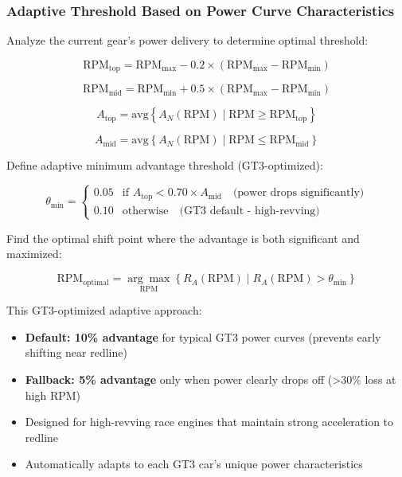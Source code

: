 \documentclass[12pt]{article}
\begin{document}
\subsubsection{Adaptive Threshold Based on Power Curve Characteristics}

Analyze the current gear's power delivery to determine optimal threshold:

\begin{equation}
\text{RPM}_{\text{top}} = \text{RPM}_{\max} - 0.2 \times (\text{RPM}_{\max} - \text{RPM}_{\min})
\end{equation}

\begin{equation}
\text{RPM}_{\text{mid}} = \text{RPM}_{\min} + 0.5 \times (\text{RPM}_{\max} - \text{RPM}_{\min})
\end{equation}

\begin{equation}
A_{\text{top}} = \text{avg}\left\{A_N(\text{RPM}) \mid \text{RPM} \geq \text{RPM}_{\text{top}}\right\}
\end{equation}

\begin{equation}
A_{\text{mid}} = \text{avg}\left\{A_N(\text{RPM}) \mid \text{RPM} \leq \text{RPM}_{\text{mid}}\right\}
\end{equation}

Define adaptive minimum advantage threshold (GT3-optimized):

\begin{equation}
\theta_{\min} = \begin{cases}
0.05 & \text{if } A_{\text{top}} < 0.70 \times A_{\text{mid}} \quad \text{(power drops significantly)} \\
0.10 & \text{otherwise} \quad \text{(GT3 default - high-revving)}
\end{cases}
\end{equation}

Find the optimal shift point where the advantage is both significant and maximized:

\begin{equation}
\text{RPM}_{\text{optimal}} = \underset{\text{RPM}}{\arg\max} \left\{ R_A(\text{RPM}) \mid R_A(\text{RPM}) > \theta_{\min} \right\}
\end{equation}

This GT3-optimized adaptive approach:
\begin{itemize}
    \item \textbf{Default: 10\% advantage} for typical GT3 power curves (prevents early shifting near redline)
    \item \textbf{Fallback: 5\% advantage} only when power clearly drops off (>30\% loss at high RPM)
    \item Designed for high-revving race engines that maintain strong acceleration to redline
    \item Automatically adapts to each GT3 car's unique power characteristics
\end{itemize}
\end{document}
